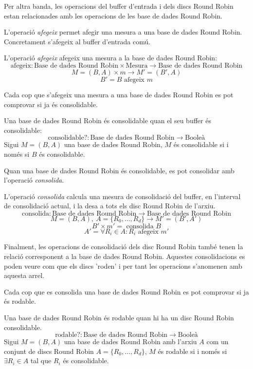 {Per altra banda, les operacions del buffer d'entrada i dels discs
Round Robin estan relacionades amb les operacions de les base de dades
Round Robin.

L'operació \emph{afegeix} permet afegir una mesura a una base de dades
Round Robin. Concretament s'afegeix al buffer d'entrada comú.
\begin{definition}
  L'operació \emph{afegeix} afegeix una mesura a la base de dades Round Robin:
  \[
  \text{afegeix}: \text{Base de dades Round Robin} \times \text{Mesura} \longrightarrow \text{Base de dades Round Robin}
  \]
  \[
  M=(B,A) \times m \longrightarrow M'= (B',A)
  \]
  \[
  B'= B \text{ afegeix } m
  \]
\end{definition}

Cada cop que s'afegeix una mesura a una base de dades Round Robin es pot comprovar si ja és consolidable. 

\begin{definition}
  Una base de dades Round Robin és consolidable quan el seu buffer és
  consolidable:
  \[
  \text{consolidable?}: \text{Base de dades Round Robin} \longrightarrow \text{Booleà}
  \]
  Sigui $M=(B,A)$ una base de dades Round Robin, $M$ és consolidable si i només
  si $B$ és consolidable.
\end{definition}

Quan una base de dades Round Robin és consolidable, es pot consolidar amb l'operació \emph{consolida}. 
 
\begin{definition}
  L'operació \emph{consolida} calcula una mesura de consolidació del
  buffer, en l'interval de consolidació actual, i la desa a tots els
  disc Round Robin de l'arxiu.
  \[
  \text{consolida}: \text{Base de dades Round Robin} \longrightarrow
  \text{Base de dades Round Robin}
  \]
  \[
  M=(B,A),\ A = \{R_0,\ldots,R_d\} \longrightarrow M'= (B',A')
  \]
  \[
  B' \times m'= \text{ consolida } B 
  \]
  \[
  A'= \forall R_i\in A: R_i \text{ afegeix } m'
  \]
\end{definition}

Finalment, les operacions de consolidació dels disc Round Robin també tenen la relació corresponent a la base de dades Round Robin. Aquestes consolidacions es poden veure com que els discs 'roden' i per tant les operacions s'anomenen amb aquesta arrel.

Cada cop que es consolida una base de dades Round Robin es pot comprovar si ja és rodable. 

\begin{definition}
  Una base de dades Round Robin és rodable quan hi ha un disc Round
  Robin consolidable.
  \[
  \text{rodable?}: \text{Base de dades Round Robin} \longrightarrow \text{Booleà}
  \]
  Sigui $M=(B,A)$ una base de dades Round Robin amb l'arxiu $A$ com un conjunt de discs Round Robin $A = \{R_0,\ldots,R_d\}$, $M$ és rodable si i només
  si  $\exists R_i\in A$ tal que $R_i$ és consolidable.
\end{definition}

}
